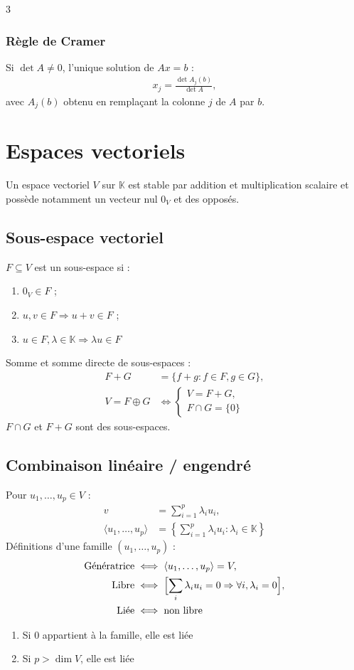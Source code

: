 \documentclass[12pt, a4paper]{article}
\newcommand{\KK}{\mathbb{K}}
\begin{document}
\begin{multicols*}{3}
\subsubsection{Règle de Cramer}
Si $\det A\ne0$, l'unique solution de $Ax=b$ :
\begin{align*}
x_j=\frac{\det A_j(b)}{\det A},
\end{align*}
avec $A_j(b)$ obtenu en remplaçant la colonne $j$ de $A$ par $b$.

\colbreak
\section{Espaces vectoriels}
Un espace vectoriel $V$ sur $\KK$ est stable par addition et multiplication scalaire et possède notamment un vecteur nul $0_V$ et des opposés.

\subsection{Sous-espace vectoriel}
$F\subseteq V$ est un sous-espace si :
\begin{enumerate}
\item $0_V\in F$ ;
\item $u,v\in F\Rightarrow u+v\in F$ ;
\item $u\in F,\lambda\in\KK\Rightarrow\lambda u\in F$
\end{enumerate}
Somme et somme directe de sous-espaces :
\begin{align*}
F+G&=\{f+g:f\in F,g\in G\},\\
V=F\oplus G&\iff\begin{cases}V=F+G,\\F\cap G=\{0\}\end{cases}
\end{align*}
$F\cap G$ et $F+G$ sont des sous-espaces.

\subsection{Combinaison linéaire / engendré}
Pour $u_1,\ldots,u_p\in V$ :
\begin{align*}
v&=\sum_{i=1}^p\lambda_i u_i,\\
\langle u_1,\ldots,u_p\rangle
&=\left\{\sum_{i=1}^p\lambda_i u_i:\lambda_i\in\KK\right\}
\end{align*}
Définitions d'une famille $(u_1,\ldots,u_p)$ :
\begin{align*}
\text{Génératrice}&\iff\langle u_1,\ldots,u_p\rangle=V,\\
\text{Libre}&\iff\Bigl[\sum_i\lambda_i u_i=0 \Rightarrow\forall i,\lambda_i=0\Bigr],\\
\text{Liée}&\iff\text{non libre}
\end{align*}
\begin{enumerate}
\item Si $0$ appartient à la famille, elle est liée
\item Si $p>\dim V$, elle est liée
\end{enumerate}


\end{multicols*}
\end{document}
